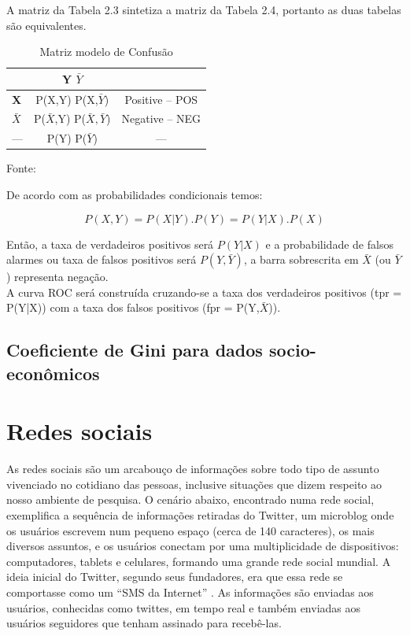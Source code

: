 A matriz da Tabela 2.3 sintetiza a matriz da Tabela 2.4, portanto as duas tabelas são equivalentes.

\begin{table}[ht]
\centering
\caption{Matriz modelo de Confusão}
\vspace{1mm}
\begin{tabular}{l|c|c}
\hline
\textbf{}           & \textbf{Y}     \textbf{$\bar{Y}$}   & \textbf{}\\
\hline
\textbf{X}          & P(X,Y)         P(X,$\bar{Y}$)       & Positive -- POS\\
\textbf{$\bar{X}$}  & P($\bar{X}$,Y) P($\bar{X},\bar{Y}$) & Negative -- NEG\\
\hline
   ---              & P(Y)           P($\bar{Y}$)         &     ---        \\
\end{tabular}
\tiny Fonte: \cite{Bradley1997}
\end{table}


De acordo com as probabilidades condicionais temos:

\begin{equation}
 P(X,Y) = P(X|Y).P(Y) = P(Y|X).P(X)
\end{equation}

Então, a taxa de verdadeiros positivos será $P(Y|X)$ e a probabilidade de falsos alarmes ou taxa de falsos positivos será $P(Y,\bar{Y})$, a barra sobrescrita em $\bar{X}$
(ou $\bar{Y}$) representa negação. \\
A curva ROC será construída cruzando-se a taxa dos verdadeiros positivos (tpr = P(Y|X)) com a taxa dos falsos positivos (fpr = P(Y,$\bar{X}$)).

\pagebreak

\subsection{Coeficiente de Gini para dados socio-econômicos}

\pagebreak



\section{Redes sociais}

As redes sociais são um arcabouço de informações sobre todo tipo de assunto vivenciado no cotidiano das pessoas, inclusive situações que dizem respeito ao nosso ambiente de pesquisa.
O cenário abaixo, encontrado numa rede social, exemplifica a sequência de informações retiradas do Twitter, um microblog onde os usuários escrevem num pequeno espaço (cerca de 140 caracteres), 
os mais diversos assuntos, e os usuários conectam por uma multiplicidade de dispositivos: computadores, tablets e celulares, formando uma grande rede social mundial. 
A ideia inicial do Twitter, segundo seus fundadores, era que essa rede se comportasse como um ``SMS da Internet'' \cite{Twitter2015}. 
As informações são enviadas aos usuários, conhecidas como twittes, em tempo real e também enviadas aos usuários seguidores que tenham assinado para recebê-las.

